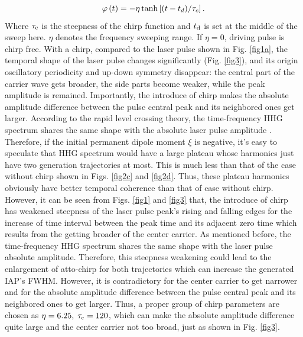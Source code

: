 \documentclass[10pt,letterpaper]{article}
\begin{document}
\begin{equation}
\varphi \left( t \right) =  - \eta \tanh \left[ {{{\left( {t - {t_d}} \right)} \mathord{\left/
			{\vphantom {{\left( {t - {t_d}} \right)} {{\tau _c}}}} \right.
			\kern-\nulldelimiterspace} {{\tau _c}}}} \right].
\label{eq17}
\end{equation}
Where $ \tau_{\rm{c}} $ is the steepness of the chirp function and $ t_{\rm{d}} $ is set at the middle of the sweep here. $ \eta $  denotes the frequency sweeping range. If $ \eta=0 $, driving pulse is chirp free. With a chirp, compared to the laser pulse shown in Fig. \ref{fig1a}, the temporal shape of the laser pulse changes significantly (Fig. \ref{fig3}), and its origin oscillatory periodicity and up-down symmetry disappear: the central part of the carrier wave gets broader, the side parts become weaker, while the peak amplitude is remained. Importantly, the introduce of chirp makes the absolute amplitude difference between the pulse central peak and its neighbored ones get larger. According to the rapid level crossing theory, the time-frequency HHG spectrum shares the same shape with the absolute laser pulse amplitude \cite{CuiNi2010NJP-wavelet}. Therefore, if the initial permanent dipole moment $\xi$ is negative, it's easy to speculate that HHG spectrum would have a large plateau whose harmonics just have two generation trajectories at most. This is much less than that of the case without chirp shown in Figs. \ref{fig2c} and \ref{fig2d}. Thus, these plateau harmonics obviously have better temporal coherence than that of case without chirp. However, it can be seen from Figs. \ref{fig1} and \ref{fig3} that, the introduce of chirp has weakened steepness of the laser pulse peak's rising and falling edges for the increase of time interval between the peak time and its adjacent zero time which results from the getting broader of the center carrier. As mentioned before, the  time-frequency HHG spectrum shares the same shape with the laser pulse absolute amplitude. Therefore, this steepness weakening could lead to the enlargement of atto-chirp \cite{attochirp-ref1-2003,attochirp-ref2-2007,attochirp-ref3-2009} for both trajectories which can increase the generated IAP's FWHM. However, it is contradictory for the center carrier to get narrower and for the absolute amplitude difference between the pulse central peak and its neighbored ones to get larger. Thus, a proper group of chirp parameters are chosen as $\eta=6.25,\;\tau_{\rm{c}}=120$, which can make the absolute amplitude difference quite large and the center carrier not too broad, just as shown in Fig. \ref{fig3}.
\end{document}
